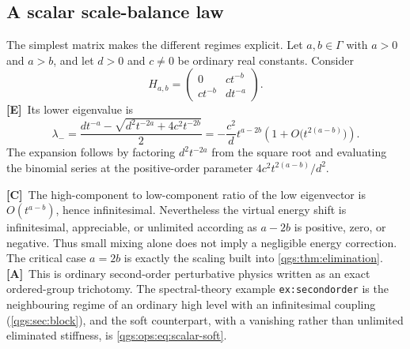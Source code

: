 \documentclass[11pt,oneside]{article}
\numberwithin{equation}{section}
\theoremstyle{plain}
\theoremstyle{definition}
\theoremstyle{remark}
\newcommand{\TE}{\textcolor{TierE}{\textsf{\bfseries[E]}}}
\newcommand{\TC}{\textcolor{TierC}{\textsf{\bfseries[C]}}}
\newcommand{\TA}{\textcolor{TierA}{\textsf{\bfseries[A]}}}
\begin{document}
\subsection{A scalar scale-balance law}
The simplest matrix makes the different regimes explicit. Let $a,b\in\Gamma$ with $a>0$ and $a>b$, and let $d>0$ and $c\ne0$ be ordinary real constants. Consider
\[
 H_{a,b}=\begin{pmatrix}0&c t^{-b}\\c t^{-b}&d t^{-a}\end{pmatrix}.
\]
\TE\ Its lower eigenvalue is
\begin{equation}\label{qgs:eq:scalarlambda}
 \lambda_-=
 \frac{d t^{-a}-\sqrt{d^2t^{-2a}+4c^2t^{-2b}}}{2}
 =-\frac{c^2}{d}t^{a-2b}
 \left(1+O\bigl(t^{2(a-b)}\bigr)\right).
\end{equation}
The expansion follows by factoring $d^2t^{-2a}$ from the square root and evaluating the binomial series at the positive-order parameter $4c^2t^{2(a-b)}/d^2$.

\TC\ The high-component to low-component ratio of the low eigenvector is $O(t^{a-b})$, hence infinitesimal. Nevertheless the virtual energy shift is infinitesimal, appreciable, or unlimited according as $a-2b$ is positive, zero, or negative. Thus small mixing alone does not imply a negligible energy correction. The critical case $a=2b$ is exactly the scaling built into \cref{qgs:thm:elimination}. \TA\ This is ordinary second-order perturbative physics written as an exact ordered-group trichotomy. The spectral-theory example \texttt{ex:secondorder} is the neighbouring regime of an ordinary high level with an infinitesimal coupling (\cref{qgs:sec:block}), and the soft counterpart, with a vanishing rather than unlimited eliminated stiffness, is \eqref{qgs:ops:eq:scalar-soft}.
\end{document}
